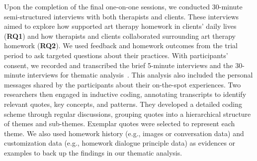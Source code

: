 Upon the completion of the final one-on-one sessions, we conducted 30-minute semi-structured interviews with both therapists and clients. These interviews aimed to explore how \name{} supported art therapy homework in clients' daily lives (\textbf{RQ1}) and how therapists and clients collaborated surrounding art therapy homework (\textbf{RQ2}). We used feedback and homework outcomes from the trial period to ask targeted questions about their practices.
With participants' consent, we recorded and transcribed the brief 5-minute interviews and the 30-minute interviews for thematic analysis~\cite{braun2006using}. This analysis also included the personal messages shared by the participants about their on-the-spot experiences.
Two researchers then engaged in inductive coding, annotating transcripts to identify relevant quotes, key concepts, and patterns. They developed a detailed coding scheme through regular discussions, grouping quotes into a hierarchical structure of themes and sub-themes. Exemplar quotes were selected to represent each theme. We also used homework history (e.g., images or conversation data) and customization data (e.g., homework dialogue principle data) as evidences or examples to back up the findings in our thematic analysis.




